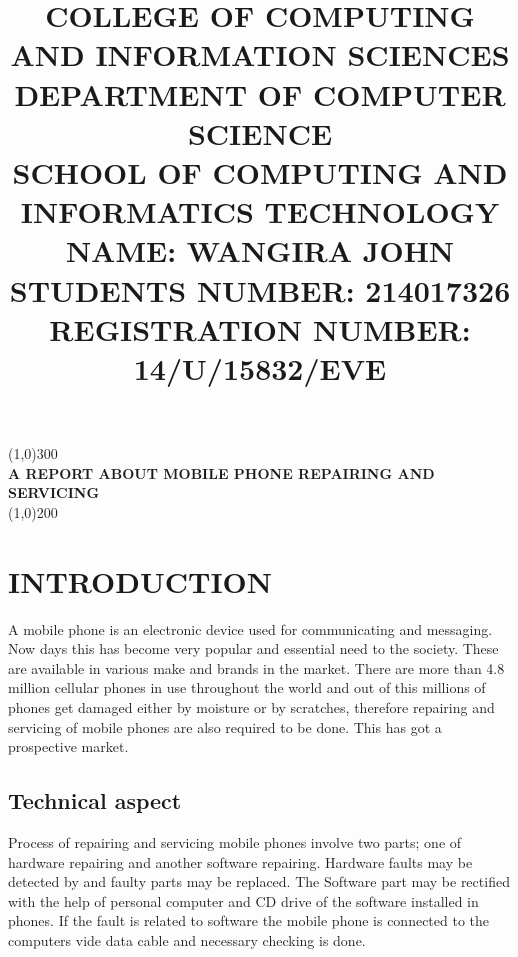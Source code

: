 \documentclass[12pt,letterpaper]{article}
\begin{document}
\begin{titlepage}
\begin{center}
\title{COLLEGE OF COMPUTING AND INFORMATION SCIENCES\\ DEPARTMENT OF COMPUTER SCIENCE\\ SCHOOL OF COMPUTING AND INFORMATICS TECHNOLOGY\\}
\maketitle
\end{center}
\begin{flushleft}
\begin{center}
\title{NAME:	     WANGIRA JOHN\\
STUDENTS NUMBER:	 214017326\\
REGISTRATION NUMBER: 14/U/15832/EVE}
\maketitle
\end{center}
\end{flushleft}
\end{titlepage}
  \begin{center}
  \line(1,0){300}\\
  [0.25in]
  \huge{\bfseries A REPORT ABOUT MOBILE PHONE REPAIRING AND SERVICING}\\
  [2mm]
  \line(1,0){200}\\
  \maketitle
  \end{center}
\section{INTRODUCTION}

A mobile phone is an electronic device used for communicating and messaging. Now days this has become very popular and essential need to the society. These are available in various make and brands in the market. There are more than 4.8 million cellular phones in use throughout the world and out of this millions of phones get damaged either by moisture or by scratches, therefore repairing and servicing of mobile phones are also required to be done. This has got a prospective market. 

\subsection{Technical aspect}
Process of repairing and servicing mobile phones involve two parts; one of hardware repairing and another software repairing. Hardware faults may be detected by  and faulty parts may be replaced. The Software part may be rectified with the help of personal computer and CD drive of the software installed in phones. If the fault is related to software the mobile phone is connected to the computers vide data cable and necessary checking is done.
\end{document}
